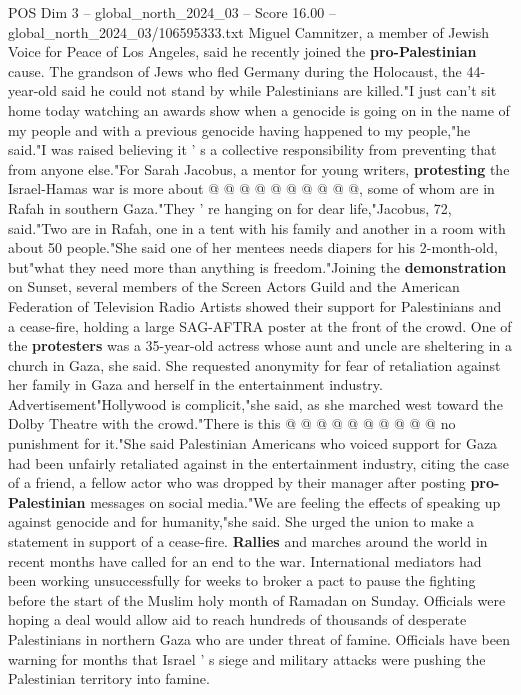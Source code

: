 \begin{textsample}{POS Dim 3 – global\_north\_2024\_03 – Score 16.00 – global\_north\_2024\_03/106595333.txt}
Miguel Camnitzer, a member of Jewish Voice for Peace of Los Angeles, said he recently joined the \textbf{pro-Palestinian} cause.
The grandson of Jews who fled Germany during the Holocaust, the 44-year-old said he could not stand by while Palestinians are killed."I just can't sit home today watching an awards show when a genocide is going on in the name of my people and with a previous genocide having happened to my people,"he said."I was raised believing it ' s a collective responsibility from preventing that from anyone else."For Sarah Jacobus, a mentor for young writers, \textbf{protesting} the Israel-Hamas war is more about @ @ @ @ @ @ @ @ @ @, some of whom are in Rafah in southern Gaza."They ' re hanging on for dear life,"Jacobus, 72, said."Two are in Rafah, one in a tent with his family and another in a room with about 50 people."She said one of her mentees needs diapers for his 2-month-old, but"what they need more than anything is freedom."Joining the \textbf{demonstration} on Sunset, several members of the Screen Actors Guild and the American Federation of Television Radio Artists showed their support for Palestinians and a cease-fire, holding a large SAG-AFTRA poster at the front of the crowd.
One of the \textbf{protesters} was a 35-year-old actress whose aunt and uncle are sheltering in a church in Gaza, she said.
She requested anonymity for fear of retaliation against her family in Gaza and herself in the entertainment industry.
Advertisement"Hollywood is complicit,"she said, as she marched west toward the Dolby Theatre with the crowd."There is this @ @ @ @ @ @ @ @ @ @ no punishment for it."She said Palestinian Americans who voiced support for Gaza had been unfairly retaliated against in the entertainment industry, citing the case of a friend, a fellow actor who was dropped by their manager after posting \textbf{pro-Palestinian} messages on social media."We are feeling the effects of speaking up against genocide and for humanity,"she said.
She urged the union to make a statement in support of a cease-fire. \textbf{Rallies} and marches around the world in recent months have called for an end to the war.
International mediators had been working unsuccessfully for weeks to broker a pact to pause the fighting before the start of the Muslim holy month of Ramadan on Sunday.
Officials were hoping a deal would allow aid to reach hundreds of thousands of desperate Palestinians in northern Gaza who are under threat of famine.
Officials have been warning for months that Israel ' s siege and military attacks were pushing the Palestinian territory into famine.

\end{textsample}
